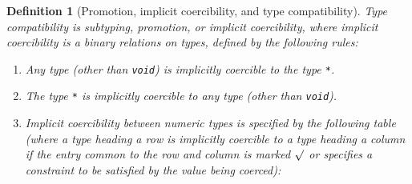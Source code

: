\makeatletter{}\documentclass[10pt,oneside]{book}
\theoremstyle{note}
\newtheorem{definition}{Definition}[section]
\begin{document}
\begin{definition}[Promotion, implicit coercibility, and type compatibility]
Type compatibility is subtyping, promotion, or implicit coercibility, where implicit coercibility is a binary relations on types, defined by the
following rules:
\begin{enumerate}
\item Any type (other than \verb'void') is implicitly coercible to the type \verb'*'.
\item The type \verb'*' is implicitly coercible to any type (other than
  \verb'void').
\item Implicit coercibility between numeric types is specified by the
  following table  (where a type heading a row is implicitly coercible to a type heading a
  column if the entry common to the row and column is marked $\surd$
  or specifies a constraint to be satisfied by the value being coerced):

\end{enumerate}
\end{definition}
\end{document}
